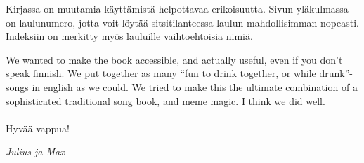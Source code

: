 Kirjassa on muutamia käyttämistä helpottavaa erikoisuutta. Sivun yläkulmassa on laulunumero, jotta
voit löytää sitsitilanteessa laulun mahdollisimman nopeasti. Indeksiin on merkitty myös lauluille vaihtoehtoisia nimiä.

We wanted to make the book accessible, and actually useful, even if you don’t
speak finnish. We put together as many “fun to drink together, or while drunk”-songs
in english as we could. We tried to make this the ultimate combination of a
sophisticated traditional song book, and meme magic. I think we did well.
\\
\\
Hyvää vappua!

\vfill
\textit{Julius ja Max}

\newpage
\blankpage

